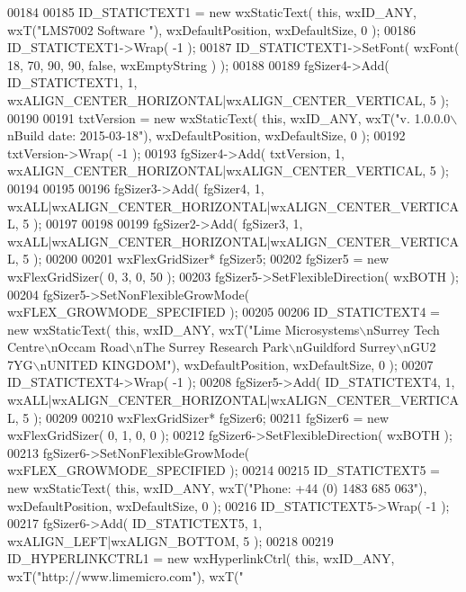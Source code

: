 \begin{DoxyCode}
00184     
00185     ID_STATICTEXT1 = \textcolor{keyword}{new} wxStaticText( \textcolor{keyword}{this}, wxID\_ANY, wxT(\textcolor{stringliteral}{"LMS7002 Software "}), wxDefaultPosition, 
      wxDefaultSize, 0 );
00186     ID_STATICTEXT1->Wrap( -1 );
00187     ID_STATICTEXT1->SetFont( wxFont( 18, 70, 90, 90, \textcolor{keyword}{false}, wxEmptyString ) );
00188     
00189     fgSizer4->Add( ID_STATICTEXT1, 1, wxALIGN\_CENTER\_HORIZONTAL|wxALIGN\_CENTER\_VERTICAL, 5 );
00190     
00191     txtVersion = \textcolor{keyword}{new} wxStaticText( \textcolor{keyword}{this}, wxID\_ANY, wxT(\textcolor{stringliteral}{"v. 1.0.0.0\(\backslash\)nBuild date: 2015-03-18"}), 
      wxDefaultPosition, wxDefaultSize, 0 );
00192     txtVersion->Wrap( -1 );
00193     fgSizer4->Add( txtVersion, 1, wxALIGN\_CENTER\_HORIZONTAL|wxALIGN\_CENTER\_VERTICAL, 5 );
00194     
00195     
00196     fgSizer3->Add( fgSizer4, 1, wxALL|wxALIGN\_CENTER\_HORIZONTAL|wxALIGN\_CENTER\_VERTICAL, 5 );
00197     
00198     
00199     fgSizer2->Add( fgSizer3, 1, wxALL|wxALIGN\_CENTER\_HORIZONTAL|wxALIGN\_CENTER\_VERTICAL, 5 );
00200     
00201     wxFlexGridSizer* fgSizer5;
00202     fgSizer5 = \textcolor{keyword}{new} wxFlexGridSizer( 0, 3, 0, 50 );
00203     fgSizer5->SetFlexibleDirection( wxBOTH );
00204     fgSizer5->SetNonFlexibleGrowMode( wxFLEX\_GROWMODE\_SPECIFIED );
00205     
00206     ID_STATICTEXT4 = \textcolor{keyword}{new} wxStaticText( \textcolor{keyword}{this}, wxID\_ANY, wxT(\textcolor{stringliteral}{"Lime Microsystems\(\backslash\)nSurrey Tech Centre\(\backslash\)nOccam
       Road\(\backslash\)nThe Surrey Research Park\(\backslash\)nGuildford Surrey\(\backslash\)nGU2 7YG\(\backslash\)nUNITED KINGDOM"}), wxDefaultPosition, wxDefaultSize,
       0 );
00207     ID_STATICTEXT4->Wrap( -1 );
00208     fgSizer5->Add( ID_STATICTEXT4, 1, wxALL|wxALIGN\_CENTER\_HORIZONTAL|wxALIGN\_CENTER\_VERTICAL, 5 );
00209     
00210     wxFlexGridSizer* fgSizer6;
00211     fgSizer6 = \textcolor{keyword}{new} wxFlexGridSizer( 0, 1, 0, 0 );
00212     fgSizer6->SetFlexibleDirection( wxBOTH );
00213     fgSizer6->SetNonFlexibleGrowMode( wxFLEX\_GROWMODE\_SPECIFIED );
00214     
00215     ID_STATICTEXT5 = \textcolor{keyword}{new} wxStaticText( \textcolor{keyword}{this}, wxID\_ANY, wxT(\textcolor{stringliteral}{"Phone: +44 (0) 1483 685 063"}), 
      wxDefaultPosition, wxDefaultSize, 0 );
00216     ID_STATICTEXT5->Wrap( -1 );
00217     fgSizer6->Add( ID_STATICTEXT5, 1, wxALIGN\_LEFT|wxALIGN\_BOTTOM, 5 );
00218     
00219     ID_HYPERLINKCTRL1 = \textcolor{keyword}{new} wxHyperlinkCtrl( \textcolor{keyword}{this}, wxID\_ANY, wxT(\textcolor{stringliteral}{"http://www.limemicro.com"}), wxT(\textcolor{stringliteral}{"
}
\end{DoxyCode}
